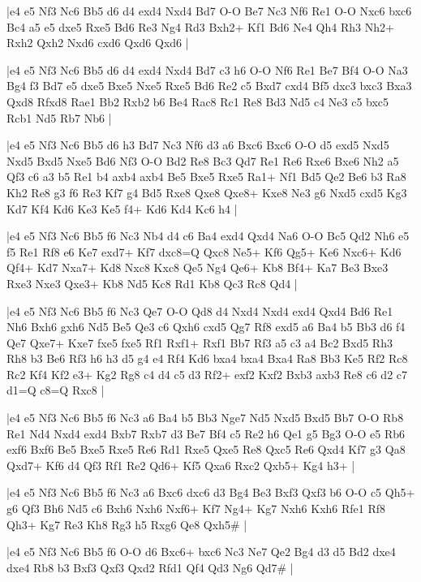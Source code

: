\whitename{}
\blackname{}
\makegametitle
|e4 e5 Nf3 Nc6 Bb5 d6 d4 exd4 Nxd4 Bd7 O-O Be7 Nc3 Nf6 Re1 O-O Nxc6 bxc6 Bc4 a5 e5 dxe5 Rxe5 Bd6 Re3 Ng4 Rd3 Bxh2+ Kf1 Bd6 Ne4 Qh4 Rh3 Nh2+ Rxh2 Qxh2 Nxd6 cxd6 Qxd6 Qxd6  |

\whitename{}
\blackname{}
\makegametitle
|e4 e5 Nf3 Nc6 Bb5 d6 d4 exd4 Nxd4 Bd7 c3 h6 O-O Nf6 Re1 Be7 Bf4 O-O Na3 Bg4 f3 Bd7 e5 dxe5 Bxe5 Nxe5 Rxe5 Bd6 Re2 c5 Bxd7 cxd4 Bf5 dxc3 bxc3 Bxa3 Qxd8 Rfxd8 Rae1 Bb2 Rxb2 b6 Be4 Rac8 Rc1 Re8 Bd3 Nd5 c4 Ne3 c5 bxc5 Rcb1 Nd5 Rb7 Nb6  |

\whitename{}
\blackname{}
\makegametitle
|e4 e5 Nf3 Nc6 Bb5 d6 h3 Bd7 Nc3 Nf6 d3 a6 Bxc6 Bxc6 O-O d5 exd5 Nxd5 Nxd5 Bxd5 Nxe5 Bd6 Nf3 O-O Bd2 Re8 Bc3 Qd7 Re1 Re6 Rxe6 Bxe6 Nh2 a5 Qf3 c6 a3 b5 Re1 b4 axb4 axb4 Be5 Bxe5 Rxe5 Ra1+ Nf1 Bd5 Qe2 Be6 b3 Ra8 Kh2 Re8 g3 f6 Re3 Kf7 g4 Bd5 Rxe8 Qxe8 Qxe8+ Kxe8 Ne3 g6 Nxd5 cxd5 Kg3 Kd7 Kf4 Kd6 Ke3 Ke5 f4+ Kd6 Kd4 Kc6 h4  |

\whitename{}
\blackname{}
\makegametitle
|e4 e5 Nf3 Nc6 Bb5 f6 Nc3 Nb4 d4 c6 Ba4 exd4 Qxd4 Na6 O-O Bc5 Qd2 Nh6 e5 f5 Re1 Rf8 e6 Ke7 exd7+ Kf7 dxc8=Q Qxc8 Ne5+ Kf6 Qg5+ Ke6 Nxc6+ Kd6 Qf4+ Kd7 Nxa7+ Kd8 Nxc8 Kxc8 Qe5 Ng4 Qe6+ Kb8 Bf4+ Ka7 Be3 Bxe3 Rxe3 Nxe3 Qxe3+ Kb8 Nd5 Kc8 Rd1 Kb8 Qc3 Rc8 Qd4  |

\whitename{}
\blackname{}
\makegametitle
|e4 e5 Nf3 Nc6 Bb5 f6 Nc3 Qe7 O-O Qd8 d4 Nxd4 Nxd4 exd4 Qxd4 Bd6 Re1 Nh6 Bxh6 gxh6 Nd5 Be5 Qe3 c6 Qxh6 cxd5 Qg7 Rf8 exd5 a6 Ba4 b5 Bb3 d6 f4 Qe7 Qxe7+ Kxe7 fxe5 fxe5 Rf1 Rxf1+ Rxf1 Bb7 Rf3 a5 c3 a4 Bc2 Bxd5 Rh3 Rh8 b3 Be6 Rf3 h6 h3 d5 g4 e4 Rf4 Kd6 bxa4 bxa4 Bxa4 Ra8 Bb3 Ke5 Rf2 Rc8 Rc2 Kf4 Kf2 e3+ Kg2 Rg8 c4 d4 c5 d3 Rf2+ exf2 Kxf2 Bxb3 axb3 Re8 c6 d2 c7 d1=Q c8=Q Rxc8  |

\whitename{}
\blackname{}
\makegametitle
|e4 e5 Nf3 Nc6 Bb5 f6 Nc3 a6 Ba4 b5 Bb3 Nge7 Nd5 Nxd5 Bxd5 Bb7 O-O Rb8 Re1 Nd4 Nxd4 exd4 Bxb7 Rxb7 d3 Be7 Bf4 c5 Re2 h6 Qe1 g5 Bg3 O-O e5 Rb6 exf6 Bxf6 Be5 Bxe5 Rxe5 Re6 Rd1 Rxe5 Qxe5 Re8 Qxc5 Re6 Qxd4 Kf7 g3 Qa8 Qxd7+ Kf6 d4 Qf3 Rf1 Re2 Qd6+ Kf5 Qxa6 Rxc2 Qxb5+ Kg4 h3+  |

\whitename{}
\blackname{}
\makegametitle
|e4 e5 Nf3 Nc6 Bb5 f6 Nc3 a6 Bxc6 dxc6 d3 Bg4 Be3 Bxf3 Qxf3 b6 O-O c5 Qh5+ g6 Qf3 Bh6 Nd5 c6 Bxh6 Nxh6 Nxf6+ Kf7 Ng4+ Kg7 Nxh6 Kxh6 Rfe1 Rf8 Qh3+ Kg7 Re3 Kh8 Rg3 h5 Rxg6 Qe8 Qxh5\#  |

\whitename{}
\blackname{}
\makegametitle
|e4 e5 Nf3 Nc6 Bb5 f6 O-O d6 Bxc6+ bxc6 Nc3 Ne7 Qe2 Bg4 d3 d5 Bd2 dxe4 dxe4 Rb8 b3 Bxf3 Qxf3 Qxd2 Rfd1 Qf4 Qd3 Ng6 Qd7\#  |

